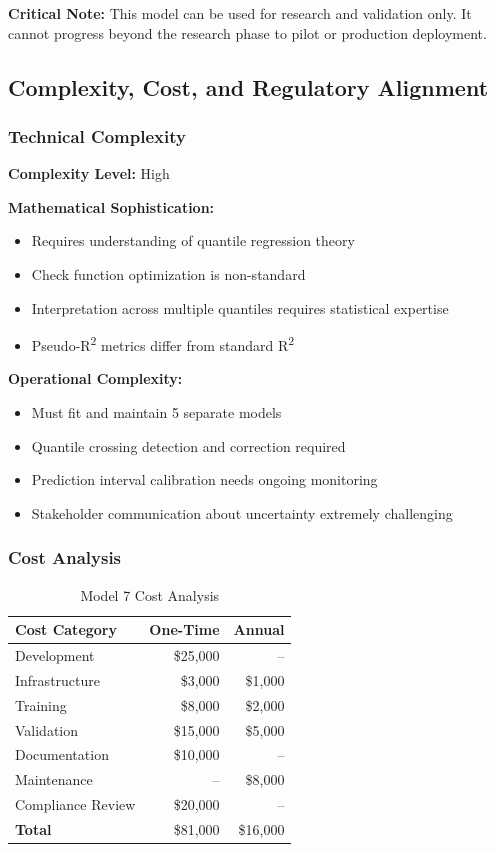 \textbf{Critical Note:} This model can be used for research and validation only. It cannot progress beyond the research phase to pilot or production deployment.

\subsection{Complexity, Cost, and Regulatory Alignment}

\subsubsection{Technical Complexity}

\textbf{Complexity Level:} High

\textbf{Mathematical Sophistication:}
\begin{itemize}
\item Requires understanding of quantile regression theory
\item Check function optimization is non-standard
\item Interpretation across multiple quantiles requires statistical expertise
\item Pseudo-R\textsuperscript{2} metrics differ from standard R\textsuperscript{2}
\end{itemize}

\textbf{Operational Complexity:}
\begin{itemize}
\item Must fit and maintain 5 separate models
\item Quantile crossing detection and correction required
\item Prediction interval calibration needs ongoing monitoring
\item Stakeholder communication about uncertainty extremely challenging
\end{itemize}

\subsubsection{Cost Analysis}

\begin{table}[H]
\centering
\caption{Model 7 Cost Analysis}
\begin{tabular}{lrr}
\toprule
\textbf{Cost Category} & \textbf{One-Time} & \textbf{Annual} \\
\midrule
Development & \$25,000 & -- \\
Infrastructure & \$3,000 & \$1,000 \\
Training & \$8,000 & \$2,000 \\
Validation & \$15,000 & \$5,000 \\
Documentation & \$10,000 & -- \\
Maintenance & -- & \$8,000 \\
Compliance Review & \$20,000 & -- \\
\midrule
\textbf{Total} & \$81,000 & \$16,000 \\
\bottomrule
\end{tabular}
\end{table}

